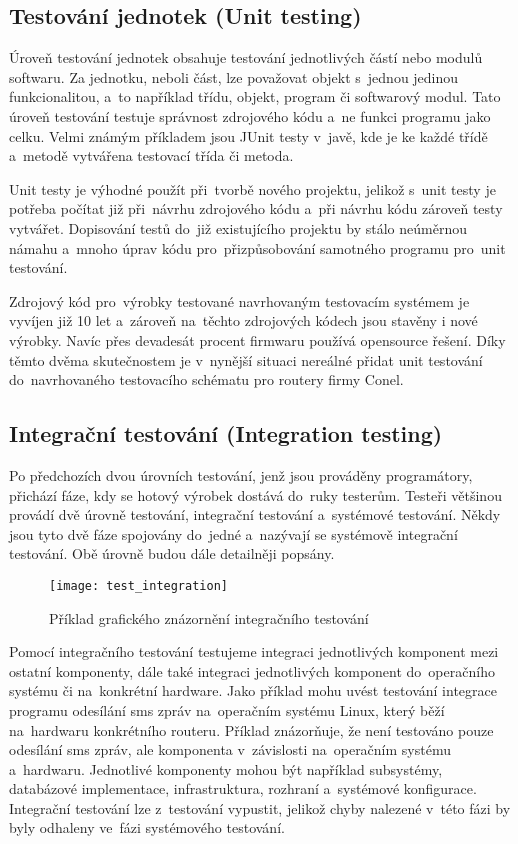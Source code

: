 \subsection{Testování jednotek (Unit testing)}
Úroveň testování jednotek obsahuje testování jednotlivých částí nebo modulů softwaru. Za jednotku, neboli část, lze považovat objekt s~jednou jedinou funkcionalitou, a~to například třídu, objekt, program či softwarový modul. Tato úroveň testování testuje správnost zdrojového kódu a~ne funkci programu jako celku. Velmi známým příkladem jsou JUnit testy v~javě, kde je ke každé třídě a~metodě vytvářena testovací třída či metoda.

Unit testy je výhodné použít při~tvorbě nového projektu, jelikož s~unit testy je potřeba počítat již při~návrhu zdrojového kódu a~při návrhu kódu zároveň testy vytvářet. Dopisování testů do~již existujícího projektu by stálo neúměrnou námahu a~mnoho úprav kódu pro~přizpůsobování samotného programu pro~unit testování.

Zdrojový kód pro~výrobky testované navrhovaným testovacím systémem je vyvíjen již 10 let a~zároveň na~těchto zdrojových kódech jsou stavěny i nové výrobky. Navíc přes devadesát procent firmwaru používá opensource řešení. Díky těmto dvěma skutečnostem je v~nynější situaci nereálné přidat unit testování do~navrhovaného testovacího schématu pro routery firmy Conel.

\subsection{Integrační testování (Integration testing)}
Po předchozích dvou úrovních testování, jenž jsou prováděny programátory, přichází fáze, kdy se hotový výrobek dostává do~ruky testerům. Testeři většinou provádí dvě úrovně testování, integrační testování a~systémové testování. Někdy jsou tyto dvě fáze spojovány do~jedné a~nazývají se systémově integrační testování. Obě úrovně budou dále detailněji popsány.

\begin{figure}[h]
  \centering
  \texttt{[image: test\_integration]}
  \caption{Příklad grafického znázornění integračního testování}
  \label{fig:test_integration}
\end{figure}

Pomocí integračního testování testujeme integraci jednotlivých komponent mezi ostatní komponenty, dále také integraci jednotlivých komponent do~operačního systému či na~konkrétní hardware. Jako příklad mohu uvést testování integrace programu odesílání sms zpráv na~operačním systému Linux, který běží na~hardwaru konkrétního routeru. Příklad znázorňuje, že není testováno pouze odesílání sms zpráv, ale komponenta v~závislosti na~operačním systému a~hardwaru. Jednotlivé komponenty mohou být například subsystémy, databázové implementace, infrastruktura, rozhraní a~systémové konfigurace. Integrační testování lze z~testování vypustit, jelikož chyby nalezené v~této fázi by byly odhaleny ve~fázi systémového testování.

